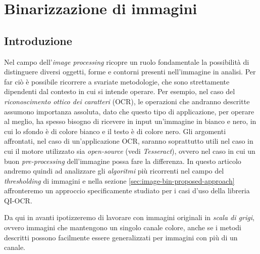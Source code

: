 \chapter{Binarizzazione di immagini}
\label{chap:image-binarization}


\section{Introduzione}
Nel campo dell'\textit{image processing} ricopre un ruolo fondamentale la possibilit\`a di distinguere diversi oggetti, forme e contorni presenti nell'immagine in analisi. Per far ci\`o \`e possibile ricorrere a svariate metodologie, che sono strettamente dipendenti dal contesto in cui si intende operare. Per esempio, nel caso del \textit{riconoscimento ottico dei caratteri} (OCR), le operazioni che andranno descritte assumono importanza assoluta, dato che questo tipo di applicazione, per operare al meglio, ha spesso bisogno di ricevere in input un'immagine in bianco e nero, in cui lo sfondo \`e di colore bianco e il testo \`e di colore nero. Gli argomenti affrontati, nel caso di un'applicazione OCR, saranno soprattutto utili nel caso in cui il motore utilizzato sia \textit{open-source} (vedi \textit{Tesseract}), ovvero nel caso in cui un buon \textit{pre-processing} dell'immagine possa fare la differenza. In questo articolo andremo quindi ad analizzare gli \textit{algoritmi} pi\`u ricorrenti nel campo del \textit{thresholding} di immagini e nella sezione \ref{sec:image-bin-proposed-approach} affronteremo un approccio specificamente studiato per i casi d'uso della libreria QI-OCR.

Da qui in avanti ipotizzeremo di lavorare con immagini originali in \textit{scala di grigi}, ovvero immagini che mantengono un singolo canale colore, anche se i metodi descritti possono facilmente essere generalizzati per immagini con pi\`u di un canale.


